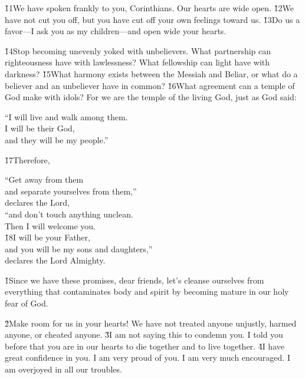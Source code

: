 \v{11}We have spoken frankly to you, Corinthians. Our hearts are wide open. \v{12}We have not cut you off, but you have cut off your own feelings toward us. \v{13}Do us a favor---I ask you as my children---and open wide your hearts.

\v{14}Stop becoming unevenly yoked with unbelievers. What partnership can righteousness have with lawlessness? What fellowship can light have with darkness? \v{15}What harmony exists between the Messiah and Beliar, or what do a believer and an unbeliever have in common? \v{16}What agreement can a temple of God make with idols? For we are the temple of the living God, just as God said:

\begin{poetry}
\poeml ``I will live and walk among them. \\
\poemll    I will be their God, \\
\poemlll       and they will be my people.''
\end{poetry}

\v{17}Therefore,

\begin{poetry}
\poeml ``Get away from them \\
\poemll    and separate yourselves from them,'' \\
\poemlll       declares the Lord, \\
\poeml ``and don't touch anything unclean. \\
\poemll    Then I will welcome you. \\
\poeml \v{18}I will be your Father, \\
\poemll    and you will be my sons and daughters,'' \\
\poemlll       declares the Lord Almighty.
\end{poetry}

\v{1}Since we have these promises, dear friends, let's cleanse ourselves from everything that contaminates body and spirit by becoming mature in our holy fear of God.

\v{2}Make room for us in your hearts! We have not treated anyone unjustly, harmed anyone, or cheated anyone. \v{3}I am not saying this to condemn you. I told you before that you are in our hearts to die together and to live together. \v{4}I have great confidence in you. I am very proud of you. I am very much encouraged. I am overjoyed in all our troubles.

